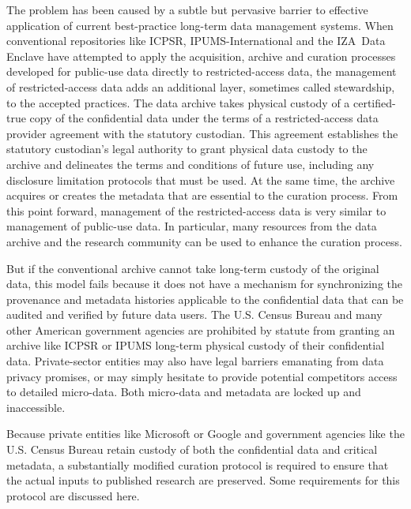 The problem has been caused by a subtle but pervasive barrier to effective
application of current best-practice long-term data management systems. When
conventional repositories like ICPSR, IPUMS-International and the IZA\ Data
Enclave have attempted to apply the acquisition, archive and curation
processes developed for public-use data directly to restricted-access data,
the management of restricted-access data adds an additional layer, sometimes
called stewardship, to the accepted practices. The data archive takes
physical custody of a certified-true copy of the confidential data under the
terms of a restricted-access data provider agreement with the statutory
custodian. This agreement establishes the statutory custodian's legal
authority to grant physical data custody to the archive and delineates the
terms and conditions of future use, including any disclosure limitation
protocols that must be used. At the same time, the archive acquires or
creates the metadata that are essential to the curation process. From this
point forward, management of the restricted-access data is very similar to
management of public-use data. In particular, many resources from the data
archive and the research community can be used to enhance the curation
process.

But if the conventional archive cannot take long-term custody of the
original data, this model fails because it does not have a mechanism for
synchronizing the provenance and metadata histories applicable to the
confidential data that can be audited and verified by future data users. The
U.S. Census Bureau and many other American government agencies are
prohibited by statute from granting an archive like ICPSR or IPUMS long-term
physical custody of their confidential data. Private-sector entities may
also have legal barriers emanating from data privacy promises, or may simply
hesitate to provide potential competitors access to detailed micro-data.
Both micro-data and metadata are locked up and inaccessible.

Because private entities like Microsoft or Google and government agencies
like the U.S. Census Bureau retain custody of both the confidential data and
critical metadata, a substantially modified curation protocol is required to
ensure that the actual inputs to published research are preserved. Some
requirements for this protocol are discussed here.
